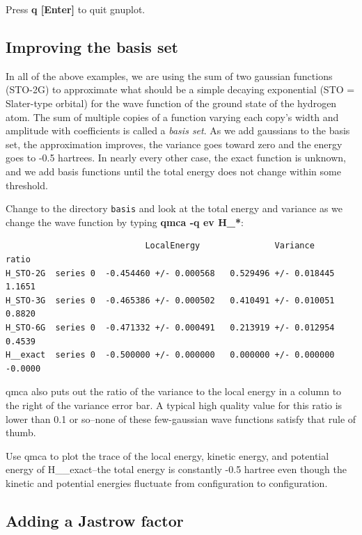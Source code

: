 
Press \textbf{q [Enter]} to quit gnuplot.

\subsection{Improving the basis set}

In all of the above examples, we are using the sum of two gaussian functions
(STO-2G) to approximate what should be a simple decaying exponential (STO =
Slater-type orbital) for the wave function of the ground state of the hydrogen
atom.  The sum of multiple copies of a function varying each copy's width and
amplitude with coefficients is called a \textit{basis set}. As we add gaussians
to the basis set, the approximation improves, the variance goes toward zero and
the energy goes to -0.5 hartrees.  In nearly every other case, the exact
function is unknown, and we add basis functions until the total energy does not
change within some threshold.

Change to the directory \texttt{basis} and look at the total energy and
variance as we change the wave function by typing \textbf{qmca -q ev H\_*}:

\begin{shaded}
\begin{verbatim}
                            LocalEnergy               Variance        ratio 
H_STO-2G  series 0  -0.454460 +/- 0.000568   0.529496 +/- 0.018445   1.1651 
H_STO-3G  series 0  -0.465386 +/- 0.000502   0.410491 +/- 0.010051   0.8820 
H_STO-6G  series 0  -0.471332 +/- 0.000491   0.213919 +/- 0.012954   0.4539 
H__exact  series 0  -0.500000 +/- 0.000000   0.000000 +/- 0.000000   -0.0000 
\end{verbatim}
\end{shaded}

qmca also puts out the ratio of the variance to the local energy in a column to
the right of the variance error bar.  A typical high quality value for this
ratio is lower than 0.1 or so--none of these few-gaussian wave functions
satisfy that rule of thumb.

Use qmca to plot the trace of the local energy, kinetic energy, and potential
energy of H\_\_exact--the total energy is constantly -0.5 hartree even though
the kinetic and potential energies fluctuate from configuration to
configuration.

\subsection{Adding a Jastrow factor}

